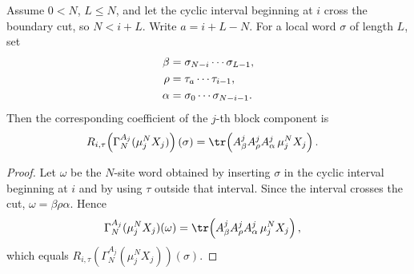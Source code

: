 \begin{lemma}
    \label{lem:block_diagonal_boundary_crossing_coefficient_formula}
    \leanok
    Assume $0<N$, $L\le N$, and let the cyclic interval beginning at $i$
    cross the boundary cut, so $N<i+L$. Write $a=i+L-N$. For a local word
    $\sigma$ of length $L$, set
    \begin{align}
        \beta
         & =\sigma_{N-i}\cdots\sigma_{L-1},
        \notag                              \\
        \rho
         & =\tau_a\cdots\tau_{i-1},
        \notag                              \\
        \alpha
         & =\sigma_0\cdots\sigma_{N-i-1}.
        \notag
    \end{align}
    Then the corresponding coefficient of the $j$-th block component is
    \begin{align}
        R_{i,\tau}\!\left(\Gamma_N^{A_j}(\mu_j^NX_j)\right)(\sigma)
         & =
        \tr\!\left(A^j_\beta A^j_\rho A^j_\alpha\,\mu_j^NX_j\right).
        \notag
    \end{align}
\end{lemma}

\begin{proof}
    \leanok
    Let $\omega$ be the $N$-site word obtained by inserting $\sigma$ in the
    cyclic interval beginning at $i$ and by using $\tau$ outside that interval.
    Since the interval crosses the cut, $\omega=\beta\rho\alpha$. Hence
    \begin{align}
        \Gamma_N^{A_j}(\mu_j^NX_j)(\omega)
         & =
        \tr\!\left(A^j_\beta A^j_\rho A^j_\alpha\,\mu_j^NX_j\right),
        \notag
    \end{align}
    which equals
    $R_{i,\tau}\!\left(\Gamma_N^{A_j}(\mu_j^NX_j)\right)(\sigma)$.
\end{proof}

